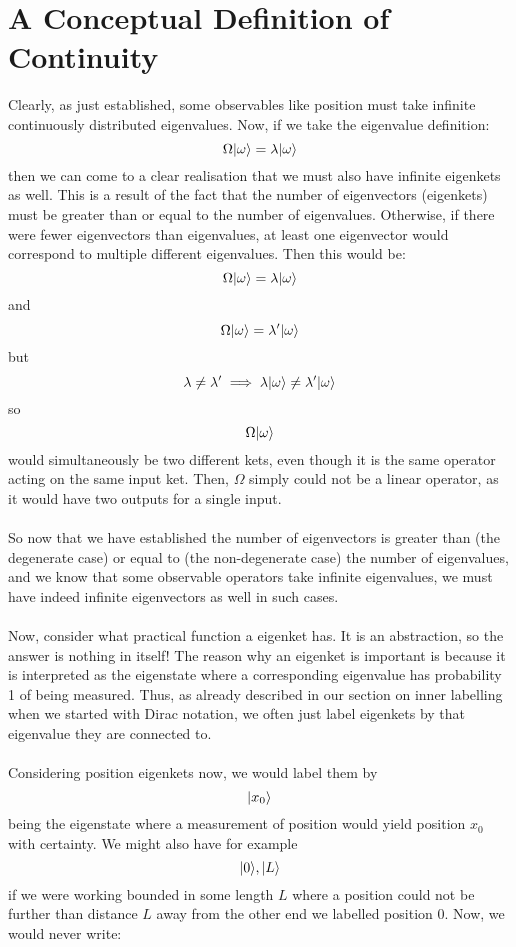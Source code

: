 \section{A Conceptual Definition of Continuity}
Clearly, as just established, some observables like position must take infinite continuously distributed eigenvalues. Now, if we take the eigenvalue definition:
$$
\Omega|\omega\rangle=\lambda|\omega\rangle
$$
then we can come to a clear realisation that we must also have infinite eigenkets as well. This is a result of the fact that the number of eigenvectors (eigenkets) must be greater than or equal to the number of eigenvalues. Otherwise, if there were fewer eigenvectors than eigenvalues, at least one eigenvector would correspond to multiple different eigenvalues. Then this would be:
$$
\Omega|\omega\rangle=\lambda|\omega\rangle
$$ 
and 
$$
\Omega|\omega\rangle=\lambda'|\omega\rangle
$$
but 
$$
\lambda\neq\lambda'\implies\lambda|\omega\rangle\neq\lambda'|\omega\rangle
$$
so 
$$
\Omega|\omega\rangle
$$
would simultaneously be two different kets, even though it is the same operator acting on the same input ket. Then, $\Omega$ simply could not be a linear operator, as it would have two outputs for a single input. 
\\\\
So now that we have established the number of eigenvectors is greater than (the degenerate case) or equal to (the non-degenerate case) the number of eigenvalues, and we know that some observable operators take infinite eigenvalues, we must have indeed infinite eigenvectors as well in such cases.
\\\\
Now, consider what practical function a eigenket has. It is an abstraction, so the answer is nothing in itself! The reason why an eigenket is important is because it is interpreted as the eigenstate where a corresponding eigenvalue has probability 1 of being measured. Thus, as already described in our section on inner labelling when we started with Dirac notation, we often just label eigenkets by that eigenvalue they are connected to. 
\\\\
Considering position eigenkets now, we would label them by 
$$
|x_{0}\rangle
$$
being the eigenstate where a measurement of position would yield position $x_{0}$ with certainty. We might also have for example
$$
|0\rangle, |L\rangle 
$$
if we were working bounded in some length $L$ where a position could not be further than distance $L$ away from the other end we labelled position $0$. Now, we would never write:
